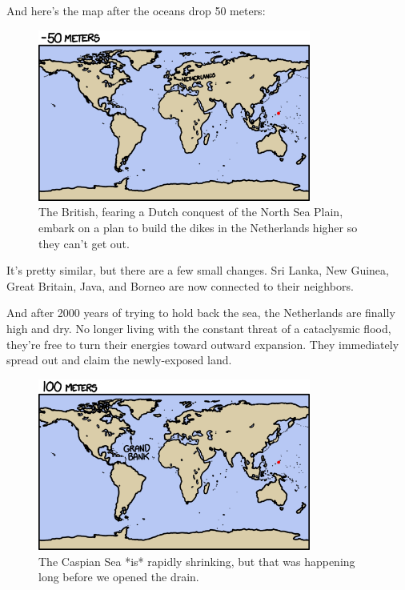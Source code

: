{{And here's the map after the oceans drop 50 meters:}

\begin{figure}[!htbp]
\centering
\includegraphics[scale=0.5, max width=0.8\textwidth]{imgs/a/53/drain_50m.png}
\caption{The British, fearing a Dutch conquest of the North Sea Plain, embark on a plan to build the dikes in the Netherlands higher so they can't get out.}
\end{figure}

{It's pretty similar, but there are a few small changes. Sri Lanka, New Guinea, Great Britain, Java, and Borneo are now connected to their neighbors.}

{And after 2000 years of trying to hold back the sea, the Netherlands are finally high and dry. No longer living with the constant threat of a cataclysmic flood, they're free to turn their energies toward outward expansion. They immediately spread out and claim the newly-exposed land.}

\begin{figure}[!htbp]
\centering
\includegraphics[scale=0.5, max width=0.8\textwidth]{imgs/a/53/drain_100m.png}
\caption{The Caspian Sea *is* rapidly shrinking, but that was happening long before we opened the drain.}
\end{figure}

}
